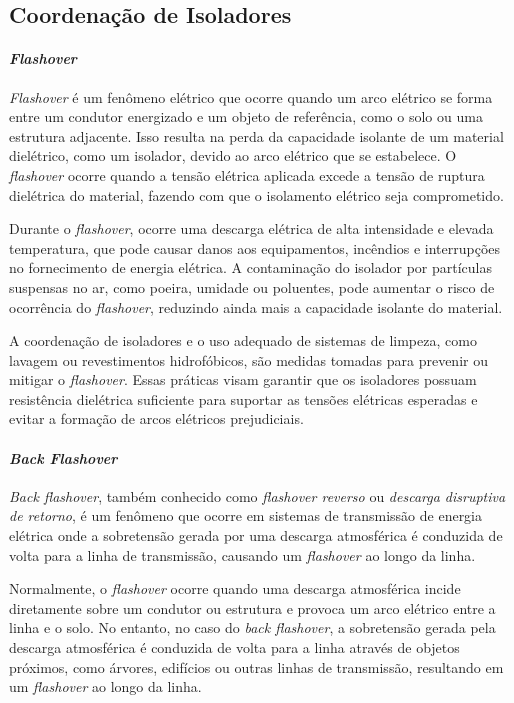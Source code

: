 \documentclass[a4paper, 12pt, onecolumn,singlespacing]{article}
\begin{document}
	\subsection{Coordenação de Isoladores}
	
	\paragraph{\textit{Flashover}} \textit{Flashover} é um fenômeno elétrico que ocorre quando um arco elétrico se forma entre um condutor energizado e um objeto de referência, como o solo ou uma estrutura adjacente. Isso resulta na perda da capacidade isolante de um material dielétrico, como um isolador, devido ao arco elétrico que se estabelece. O \textit{flashover} ocorre quando a tensão elétrica aplicada excede a tensão de ruptura dielétrica do material, fazendo com que o isolamento elétrico seja comprometido.
	
	Durante o \textit{flashover}, ocorre uma descarga elétrica de alta intensidade e elevada temperatura, que pode causar danos aos equipamentos, incêndios e interrupções no fornecimento de energia elétrica. A contaminação do isolador por partículas suspensas no ar, como poeira, umidade ou poluentes, pode aumentar o risco de ocorrência do \textit{flashover}, reduzindo ainda mais a capacidade isolante do material.
	
	A coordenação de isoladores e o uso adequado de sistemas de limpeza, como lavagem ou revestimentos hidrofóbicos, são medidas tomadas para prevenir ou mitigar o \textit{flashover}. Essas práticas visam garantir que os isoladores possuam resistência dielétrica suficiente para suportar as tensões elétricas esperadas e evitar a formação de arcos elétricos prejudiciais.
	
	\paragraph{\textit{Back Flashover}}
	
	\textit{Back flashover}, também conhecido como \textit{flashover reverso} ou \textit{descarga disruptiva de retorno}, é um fenômeno que ocorre em sistemas de transmissão de energia elétrica onde a sobretensão gerada por uma descarga atmosférica é conduzida de volta para a linha de transmissão, causando um \textit{flashover} ao longo da linha.
	
	Normalmente, o \textit{flashover} ocorre quando uma descarga atmosférica incide diretamente sobre um condutor ou estrutura e provoca um arco elétrico entre a linha e o solo. No entanto, no caso do \textit{back flashover}, a sobretensão gerada pela descarga atmosférica é conduzida de volta para a linha através de objetos próximos, como árvores, edifícios ou outras linhas de transmissão, resultando em um \textit{flashover} ao longo da linha.
	
\end{document}
